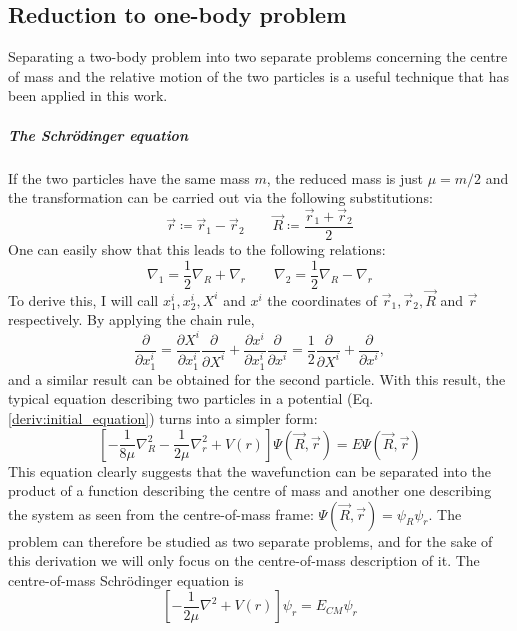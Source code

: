 \begin{appendices}
\chapter{Reduction to one-body problem}\label{appendix:onebody}
Separating a two-body problem into two separate problems concerning the centre of mass and the relative motion of the two particles is a useful technique that has been applied in this work.

\paragraph{The Schrödinger equation}
If the two particles have the same mass \(m\), the reduced mass is just \(\mu = m /2\) and the transformation can be carried out via the following substitutions:
\begin{equation}\label{eq:twobody_transform}
	\vec{r}\coloneqq \vec{r}_1 - \vec{r}_2 \qquad
	\vec{R} \coloneqq \frac{\vec{r}_1 + \vec{r}_2}{2}
\end{equation}
One can easily show that this leads to the following relations:
\begin{equation}
	\nabla _1 = \frac{1}{2} \nabla _R + \nabla _r
	\qquad
	\nabla _2 = \frac{1}{2} \nabla _R - \nabla _r
\end{equation}
To derive this, I will call \(x^i_1, x^i_2, X^i \) and \(x^i\) the coordinates of \(\vec{r}_1, \vec{r}_2, \vec{R} \) and \(\vec{r}\) respectively. By applying the chain rule,
\begin{equation}
	\frac{\partial }{\partial x^i_1} = \frac{\partial X^i}{\partial x^i_1} \frac{\partial }{\partial X^i} + \frac{\partial x^i}{\partial x^i_1} \frac{\partial }{\partial x^i} = \frac{1}{2} \frac{\partial }{\partial X^i} + \frac{\partial }{\partial x^i},
\end{equation}
and a similar result can be obtained for the second particle. With this result, the typical equation describing two particles in a potential (Eq. \eqref{deriv:initial_equation}) turns into a simpler form:
\begin{equation}
	\left[- \frac{1}{8\mu} \nabla _R^{2} - \frac{1}{2\mu } \nabla _r^2 + V(r)\right] \Psi (\vec{R},\vec{r})= E \Psi (\vec{R},\vec{r})
\end{equation}
This equation clearly suggests that the wavefunction can be separated into the product of a function describing the centre of mass and another one describing the system as seen from the centre-of-mass frame: \(\Psi (\vec{R},\vec{r}) = \psi_R \psi _r\). The problem can therefore be studied as two separate problems, and for the sake of this derivation we will only focus on the centre-of-mass description of it. The centre-of-mass Schrödinger equation is
\begin{equation}
	\left[- \frac{1}{2\mu }\nabla^2 + V(r)\right]\psi _r = E_{CM} \psi _r
\end{equation}


\end{appendices}
